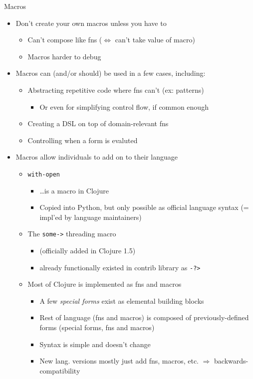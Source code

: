 \documentclass{beamer}
\begin{document}
\begin{frame}[allowframebreaks]{Macros}
\begin{itemize}
    \framebreak
  \item Don't create your own macros unless you have to
    \begin{itemize}
    \item Can't compose like fns ($\Leftrightarrow$ can't take value of macro)
    \item Macros harder to debug
    \end{itemize}
  \item Macros can (and/or should) be used in a few cases, including:
    \begin{itemize}
    \item Abstracting repetitive code where fns can't (ex: patterns)
      \begin{itemize}
      \item Or even for simplifying control flow, if common enough
      \end{itemize}
    \item Creating a DSL on top of domain-relevant fns
    \item Controlling when a form is evaluted
    \end{itemize}
  \item Macros allow individuals to add on to their language
    \begin{itemize}
    \item \texttt{with-open}
      \begin{itemize}
      \item \ldots is a macro in Clojure
      \item Copied into Python, but only possible as official language
        syntax (= impl'ed by language maintainers)
      \end{itemize}
    \item The \texttt{some->} threading macro
      \begin{itemize}
      \item (officially added in Clojure 1.5)
      \item already functionally existed in contrib library as \texttt{-?>}
      \end{itemize}
    \item Most of Clojure is implemented as fns and macros
      \begin{itemize}
      \item A few \textit{special forms} exist as elemental building
        blocks
      \item Rest of language (fns and macros) is composed of
        previously-defined forms (special forms, fns and
        macros)
      \item Syntax is simple and doesn't change
      \item New lang. versions mostly just add fns, macros, etc. $\Rightarrow$ backwards-compatibility
      \end{itemize}
    \end{itemize}
  \end{itemize}
\end{frame}
\end{document}
